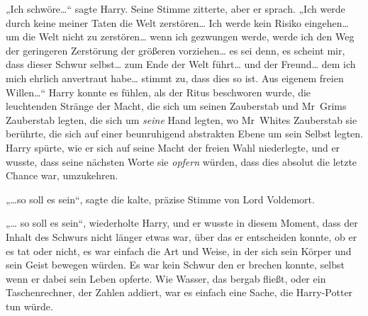 „Ich schwöre…“ sagte Harry.
Seine Stimme zitterte, aber er sprach.
„Ich werde durch keine meiner Taten die Welt zerstören… Ich werde kein Risiko eingehen… um die Welt nicht zu zerstören… wenn ich gezwungen werde, werde ich den Weg der geringeren Zerstörung der größeren vorziehen… es sei denn, es scheint mir, dass dieser Schwur selbst… zum Ende der Welt führt… und der Freund… dem ich mich ehrlich anvertraut habe… stimmt zu, dass dies so ist. Aus eigenem freien Willen…“
Harry konnte es fühlen, als der Ritus beschworen wurde, die leuchtenden Stränge der Macht, die sich um seinen Zauberstab und Mr~Grims Zauberstab legten, die sich um \emph{seine} Hand legten, wo Mr~Whites Zauberstab sie berührte, die sich auf einer beunruhigend abstrakten Ebene um sein Selbst legten. Harry spürte, wie er sich auf seine Macht der freien Wahl niederlegte, und er wusste, dass seine nächsten Worte sie \emph{opfern} würden, dass dies absolut die letzte Chance war, umzukehren.

„…so soll es sein“, sagte die kalte, präzise Stimme von Lord Voldemort.

„… so soll es sein“, wiederholte Harry, und er wusste in diesem Moment, dass der Inhalt des Schwurs nicht länger etwas war, über das er entscheiden konnte, ob er es tat oder nicht, es war einfach die Art und Weise, in der sich sein Körper und sein Geist bewegen würden. Es war kein Schwur den er brechen konnte, selbst wenn er dabei sein Leben opferte. Wie Wasser, das bergab fließt, oder ein Taschenrechner, der Zahlen addiert, war es einfach eine Sache, die Harry-Potter tun würde.

